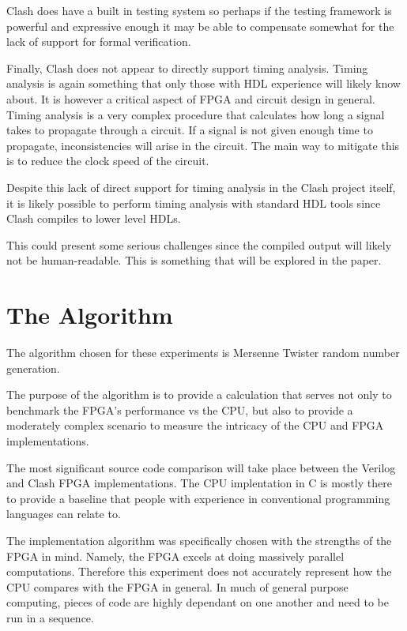 \documentclass{article}
\begin{document}
    Clash does have a built in testing system so perhaps if the testing framework is
    powerful and expressive enough it may be able to compensate somewhat
    for the lack of support for formal verification.

    Finally, Clash does not appear to directly support timing analysis. Timing analysis
    is again something that only those with HDL experience will likely know about. It is
    however a critical aspect of FPGA and circuit design in general. Timing analysis is a
    very complex procedure that calculates how long a signal takes to propagate
    through a circuit. If a signal is not given enough time to propagate, inconsistencies
    will arise in the circuit. The main way to mitigate this is to reduce the clock speed
    of the circuit.

    Despite this lack of direct support for timing analysis in the Clash project itself,
    it is likely possible to perform timing analysis with standard HDL tools since
    Clash compiles to lower level HDLs.

    This could present some serious challenges since the compiled output will
    likely not be human-readable. This is something that will be explored in the paper.
    
    \section{The Algorithm}

    The algorithm chosen for these experiments is Mersenne Twister
    random number generation.

    The purpose of the algorithm is to provide a calculation that serves not only to benchmark
    the FPGA's performance vs the CPU, but also to provide a moderately complex
    scenario to measure the intricacy of the CPU and FPGA implementations.

    The most significant source code comparison will take place between the Verilog and
    Clash FPGA implementations. The CPU implentation in C is mostly there to provide
    a baseline that people with experience in conventional programming languages
    can relate to.

    The implementation algorithm was specifically chosen with the strengths of the FPGA
    in mind. Namely, the FPGA excels at doing massively parallel computations.
    Therefore this experiment does not accurately represent how the CPU compares
    with the FPGA in general. In much of general purpose computing, pieces of code
    are highly dependant on one another and need to be run in a sequence.
\end{document}

